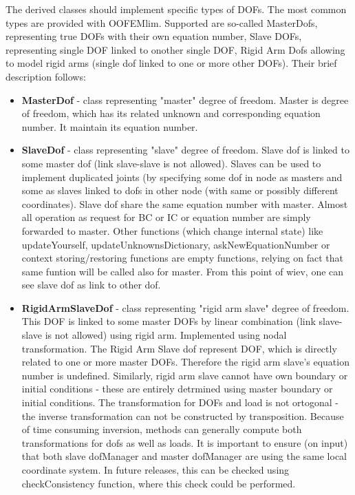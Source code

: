 \documentclass[12pt,draft]{article}
\newcommand{\class}[1]{{\bf #1}}
\begin{document}
The derived classes should implement specific types of DOFs. The
most common types are provided with OOFEMlim. Supported are so-called
MasterDofs, representing true DOFs with their own equation number,
Slave DOFs, representing single DOF linked to onother single DOF, Rigid Arm Dofs
allowing to model rigid arms (single dof linked to one or more other DOFs).
Their brief description follows:
\begin{itemize}
\item
\class{MasterDof} - class representing "master" degree of freedom. 
Master is degree of freedom, which has its related unknown and
    corresponding equation number. It maintain its equation number.
\item
\class{SlaveDof} - class representing "slave" degree of freedom. 
Slave dof is linked to some master dof (link slave-slave is not
allowed). Slaves can be used to implement duplicated joints (by
specifying some dof in node as masters and some as slaves linked to
dofs in other node (with same or possibly different
coordinates). Slave dof share the same equation number with
master. Almost all operation as request for BC or IC or equation
number are simply forwarded to master. Other functions (which change
internal state) like updateYourself, updateUnknownsDictionary,
askNewEquationNumber or context storing/restoring functions are empty
functions, relying on fact that same funtion will be called also for
master. From this point of wiev, one can see slave dof as link to
other dof.
\item
\class{RigidArmSlaveDof} - class representing "rigid arm slave" degree
of freedom. This DOF is linked to some master DOFs by linear
combination (link slave-slave is
not allowed) using rigid arm. Implemented using nodal
transformation. The Rigid Arm Slave dof represent DOF, which is
directly related to one or more master DOFs. Therefore the rigid arm slave's
equation number is undefined. Similarly, rigid arm slave cannot have
own boundary or initial conditions - these are entirely detrmined
using master boundary or initial conditions.
The transformation for DOFs and load is not ortogonal - the inverse
transformation can not be constructed by transposition. Because of
time consuming inversion, methods can generally compute both
transformations for dofs as well as loads. It is important to ensure
(on input) that both slave dofManager and master dofManager are using
the same local coordinate system. In future releases, this can be
checked using checkConsistency function, where this check could be
performed. 
\end{itemize}
\end{document}
